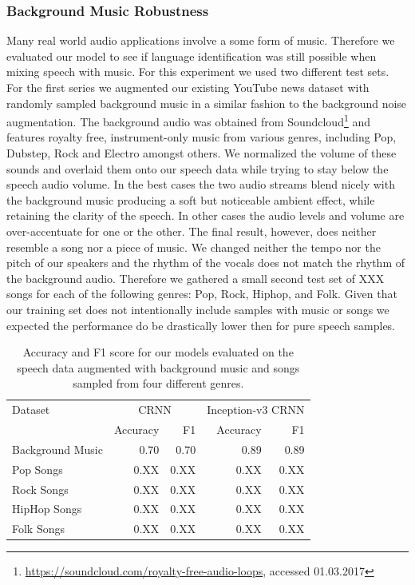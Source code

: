 \subsubsection{Background Music Robustness} 
\label{sec:music_robustness}
Many real world audio applications involve a some form of music. Therefore we evaluated our model to see if language identification was still possible when mixing speech with music. For this experiment we used two different test sets. For the first series we augmented our existing YouTube news dataset with randomly sampled background music in a similar fashion to the background noise augmentation. The background audio was obtained from Soundcloud\footnote{\url{https://soundcloud.com/royalty-free-audio-loops}, accessed 01.03.2017} and features royalty free, instrument-only music from various genres, including Pop, Dubstep, Rock and Electro amongst others. 
We normalized the volume of these sounds and overlaid them onto our speech data while trying to stay below the speech audio volume. In the best cases the two audio streams blend nicely with the background music producing a soft but noticeable ambient effect, while retaining the clarity of the speech. In other cases the audio levels and volume are over-accentuate for one or the other. The final result, however, does neither resemble a song nor a piece of music. We changed neither the tempo nor the pitch of our speakers and the rhythm of the vocals does not match the rhythm of the background audio. Therefore we gathered a small second test set of XXX  songs for each of the following genres: Pop, Rock, Hiphop, and Folk. 
Given that our training set does not intentionally include samples with music or songs we expected the performance do be drastically lower then for pure speech samples.

	\begin{table}[]
	\centering
	\begin{tabularx}{\textwidth}{lrrrr}
	\toprule
Dataset & \multicolumn{2}{c}{CRNN} & \multicolumn{2}{c}{Inception-v3 CRNN} \\   
                  & Accuracy  & F1    & Accuracy   & F1   \\ \midrule
Background Music  & 0.70      & 0.70  & 0.89  & 0.89 \\
Pop Songs         & 0.XX      & 0.XX  & 0.XX  & 0.XX \\
Rock Songs        & 0.XX      & 0.XX  & 0.XX  & 0.XX \\
HipHop Songs      & 0.XX      & 0.XX  & 0.XX  & 0.XX \\
Folk Songs        & 0.XX      & 0.XX  & 0.XX  & 0.XX \\

 	\bottomrule
	\end{tabularx}
	\caption{Accuracy and F1 score for our models evaluated on the speech data augmented with background music and songs sampled from four different genres.}
	\label{tab:audio_duration}
	\end{table}

